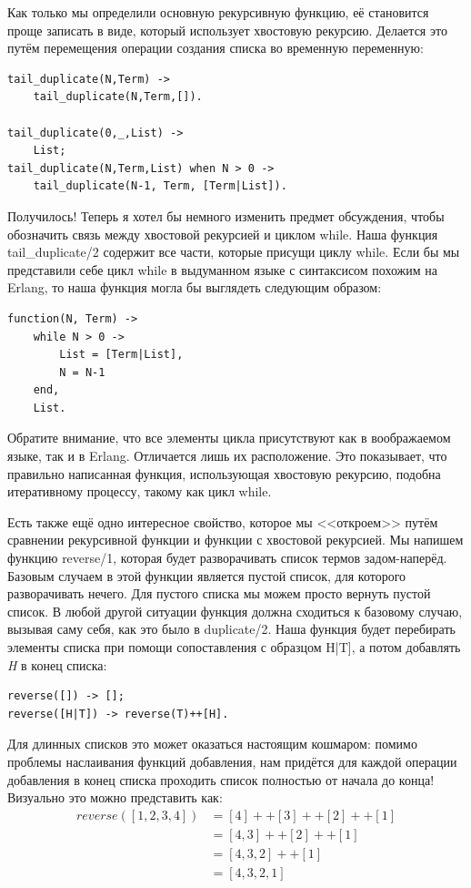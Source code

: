 \documentclass[a4paper,12pt]{report}
\newcommand{\ops}{\colorbox{lgreen}}
\begin{document}
Как только мы определили основную рекурсивную функцию, её становится проще записать в виде, который использует хвостовую рекурсию. Делается это путём перемещения операции создания списка во временную переменную:
\begin{lstlisting}[style=erlang]
tail_duplicate(N,Term) ->
    tail_duplicate(N,Term,[]).
 
tail_duplicate(0,_,List) ->
    List;
tail_duplicate(N,Term,List) when N > 0 ->
    tail_duplicate(N-1, Term, [Term|List]).
\end{lstlisting}

Получилось! Теперь я хотел бы немного изменить предмет обсуждения, чтобы обозначить связь между хвостовой рекурсией и циклом while. Наша функция \ops{tail\_duplicate/2} содержит все части, которые присущи циклу while. Если бы мы представили себе цикл while в выдуманном языке с синтаксисом похожим на Erlang, то наша функция могла бы выглядеть следующим образом:
\begin{lstlisting}[style=erlang]
function(N, Term) ->
    while N > 0 ->
        List = [Term|List],
        N = N-1
    end,
    List.
\end{lstlisting}

Обратите внимание, что все элементы цикла присутствуют как в воображаемом языке, так и в Erlang. Отличается лишь их расположение. Это показывает, что правильно написанная функция, использующая хвостовую рекурсию, подобна итеративному процессу, такому как цикл while.

Есть также ещё одно интересное свойство, которое мы <<откроем>> путём сравнении рекурсивной функции и функции с хвостовой рекурсией. Мы напишем функцию \ops{reverse/1}, которая будет разворачивать список термов задом\--наперёд. Базовым случаем в этой функции является пустой список, для которого разворачивать нечего. Для пустого списка мы можем просто вернуть пустой список. В любой другой ситуации функция должна сходиться к базовому случаю, вызывая саму себя, как это было в \ops{duplicate/2}. Наша функция будет перебирать элементы списка при помощи сопоставления с образцом \ops{H|T]}, а потом добавлять \emph{H} в конец списка:
\begin{lstlisting}[style=erlang]
reverse([]) -> [];
reverse([H|T]) -> reverse(T)++[H].
\end{lstlisting}

Для длинных списков это может оказаться настоящим кошмаром: помимо проблемы наслаивания функций добавления, нам придётся для каждой операции добавления в конец списка проходить список полностью от начала до конца! Визуально это можно представить как:
\begin{align*}
reverse([1,2,3,4]) &= [4]++[3]++[2]++[1]\\
&= [4,3]++[2]++[1]\\
&= [4,3,2]++[1]\\
&= [4,3,2,1]\\
\end{align*}
\end{document}
